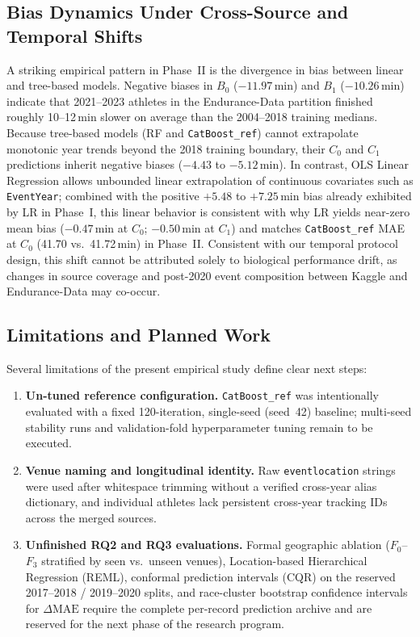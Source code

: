 \documentclass[11pt,a4paper]{article}
\begin{document}
\subsection{Bias Dynamics Under Cross-Source and Temporal Shifts}

A striking empirical pattern in Phase~II is the divergence in bias
between linear and tree-based models. Negative biases in $B_0$
($-11.97$\,min) and $B_1$ ($-10.26$\,min) indicate that 2021--2023
athletes in the Endurance-Data partition finished roughly 10--12\,min
slower on average than the 2004--2018 training medians.
Because tree-based models (RF and \texttt{CatBoost\_ref}) cannot
extrapolate monotonic year trends beyond the 2018 training boundary,
their $C_0$ and $C_1$ predictions inherit negative biases ($-4.43$ to
$-5.12$\,min). In contrast, OLS Linear Regression allows unbounded
linear extrapolation of continuous covariates such as \texttt{EventYear};
combined with the positive $+5.48$ to $+7.25$\,min bias already
exhibited by LR in Phase~I, this linear behavior is consistent with
why LR yields near-zero mean bias ($-0.47$\,min at $C_0$; $-0.50$\,min
at $C_1$) and matches \texttt{CatBoost\_ref} MAE at $C_0$ (41.70 vs.\
41.72\,min) in Phase~II. Consistent with our temporal protocol design, this shift
cannot be attributed solely to biological performance drift, as
changes in source coverage and post-2020 event composition between
Kaggle and Endurance-Data may co-occur.

\subsection{Limitations and Planned Work}

Several limitations of the present empirical study define clear next
steps:
\begin{enumerate}[leftmargin=*]
  \item \textbf{Un-tuned reference configuration.}
  \texttt{CatBoost\_ref} was intentionally evaluated with a fixed
  120-iteration, single-seed (seed~42) baseline; multi-seed stability
  runs and validation-fold hyperparameter tuning remain to be executed.
  \item \textbf{Venue naming and longitudinal identity.} Raw
  \texttt{eventlocation} strings were used after whitespace trimming
  without a verified cross-year alias dictionary, and individual
  athletes lack persistent cross-year tracking IDs across the merged
  sources.
  \item \textbf{Unfinished RQ2 and RQ3 evaluations.} Formal geographic
  ablation ($F_0$--$F_3$ stratified by seen vs.\ unseen venues),
  Location-based Hierarchical Regression (REML), conformal prediction
  intervals (CQR) on the reserved 2017--2018 / 2019--2020 splits, and
  race-cluster bootstrap confidence intervals for $\Delta\mathrm{MAE}$
  require the complete per-record prediction archive and are reserved
  for the next phase of the research program.
\end{enumerate}
\end{document}
